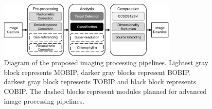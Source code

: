
\begin{figure}
    \centering
    \includegraphics[width = 0.8\textwidth]{figs/img_processing/image-processing-pipeline.png}
    \caption{Diagram of the proposed imaging processing pipelines. Lightest gray block represents MOBIP, darker gray blocks represent BOBIP, darkest gray block represents TOBIP and black block represents COBIP. The dashed blocks represent modules planned for advanced image processing pipelines.}
    \label{fig:image-processing-pipelines}
\end{figure}
